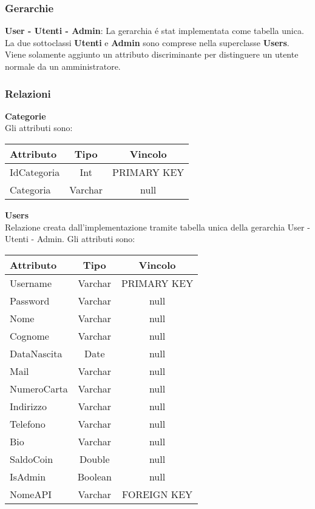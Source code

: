 {{		\subsubsection{Gerarchie}
		\textbf{User - Utenti - Admin}: La gerarchia é stat implementata come tabella unica. La due sottoclassi \textbf{Utenti} e \textbf{Admin} sono comprese nella superclasse \textbf{Users}. Viene solamente aggiunto un attributo discriminante per distinguere un utente normale da un amministratore.\\
		\subsubsection{Relazioni}
		\textbf{Categorie}\\
		Gli attributi sono: \\
			\begin{center}
			\renewcommand\arraystretch{1.2} \begin{tabular}{lcc}
				\textbf{Attributo}&\textbf{Tipo}&\textbf{Vincolo}\\ \hline
				IdCategoria&Int&PRIMARY KEY\\
				Categoria&Varchar&null \\
			\end{tabular}
			\end{center}
		\textbf{Users}\\
			Relazione creata dall'implementazione tramite tabella unica della gerarchia User - Utenti - Admin. Gli attributi sono:
			\begin{center}
			\renewcommand\arraystretch{1.2} \begin{tabular}{lcc}
				\textbf{Attributo}&\textbf{Tipo}&\textbf{Vincolo}\\ \hline
				Username&Varchar&PRIMARY KEY\\
				Password&Varchar&null \\				
				Nome&Varchar&null \\
				Cognome&Varchar&null \\
				DataNascita&Date&null \\				
				Mail&Varchar&null \\
				NumeroCarta&Varchar&null \\
				Indirizzo&Varchar&null \\
				Telefono&Varchar&null \\
				Bio&Varchar&null \\
				SaldoCoin&Double&null \\
				IsAdmin&Boolean&null \\
				NomeAPI&Varchar&FOREIGN KEY\\
			\end{tabular}
			\end{center} 				
			
}}
